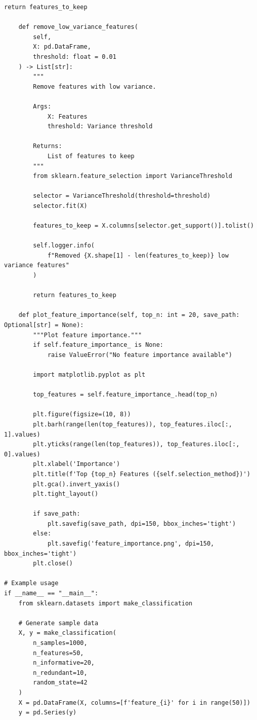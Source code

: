 \begin{lstlisting}[style=python, caption={Comprehensive Feature Selection Framework}]
        return features_to_keep

    def remove_low_variance_features(
        self,
        X: pd.DataFrame,
        threshold: float = 0.01
    ) -> List[str]:
        """
        Remove features with low variance.

        Args:
            X: Features
            threshold: Variance threshold

        Returns:
            List of features to keep
        """
        from sklearn.feature_selection import VarianceThreshold

        selector = VarianceThreshold(threshold=threshold)
        selector.fit(X)

        features_to_keep = X.columns[selector.get_support()].tolist()

        self.logger.info(
            f"Removed {X.shape[1] - len(features_to_keep)} low variance features"
        )

        return features_to_keep

    def plot_feature_importance(self, top_n: int = 20, save_path: Optional[str] = None):
        """Plot feature importance."""
        if self.feature_importance_ is None:
            raise ValueError("No feature importance available")

        import matplotlib.pyplot as plt

        top_features = self.feature_importance_.head(top_n)

        plt.figure(figsize=(10, 8))
        plt.barh(range(len(top_features)), top_features.iloc[:, 1].values)
        plt.yticks(range(len(top_features)), top_features.iloc[:, 0].values)
        plt.xlabel('Importance')
        plt.title(f'Top {top_n} Features ({self.selection_method})')
        plt.gca().invert_yaxis()
        plt.tight_layout()

        if save_path:
            plt.savefig(save_path, dpi=150, bbox_inches='tight')
        else:
            plt.savefig('feature_importance.png', dpi=150, bbox_inches='tight')
        plt.close()

# Example usage
if __name__ == "__main__":
    from sklearn.datasets import make_classification

    # Generate sample data
    X, y = make_classification(
        n_samples=1000,
        n_features=50,
        n_informative=20,
        n_redundant=10,
        random_state=42
    )
    X = pd.DataFrame(X, columns=[f'feature_{i}' for i in range(50)])
    y = pd.Series(y)


\end{lstlisting}
